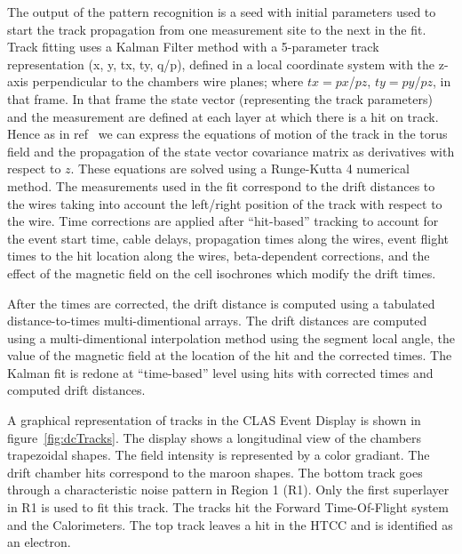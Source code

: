 \documentclass{elsart}
\begin{document}
The output of the pattern recognition
is a seed with initial parameters used to start the track propagation from one measurement site to the next in the fit.
Track fitting uses a Kalman Filter method with a 5-parameter track representation (x, y, tx, ty, q/p), defined
in a local coordinate system with the z-axis perpendicular to the chambers wire planes; where $tx=px$/$pz$,
$ty=py$/$pz$, in that frame.  
In that frame the state vector (representing the track parameters) and the measurement are defined at each layer 
at which there is a hit on track. Hence as in ref~\cite{spiri} we can express the equations of motion of the track in the torus field
and the propagation of the state vector covariance matrix as derivatives with respect to $z$. 
These equations  are solved using a Runge-Kutta 4 numerical method.  
The measurements used in the fit correspond to the drift distances to the wires
taking into account the left/right position of the track with respect to the wire. Time corrections are applied
after ``hit-based'' tracking to account for the event start time, cable delays, propagation times along the
wires, event flight times to the hit location along the wires, beta-dependent corrections, and the effect of
the magnetic field on the cell isochrones which modify the drift times.  

After the times are corrected, the drift distance is computed using a tabulated distance-to-times
multi-dimentional arrays.  The drift distances are computed using a multi-dimentional interpolation method
using the segment local angle, the value of the magnetic field at the location of the hit and the corrected
times.  The Kalman fit is redone at ``time-based'' level using hits with corrected times and computed drift
distances. 

A graphical representation of tracks in the CLAS Event Display is shown in figure~\ref{fig:dcTracks}.  The
display shows a longitudinal view of the chambers trapezoidal shapes. The field intensity is represented by a
color gradiant. The drift chamber hits correspond to the maroon shapes.  The bottom track goes through a
characteristic noise pattern in Region 1 (R1). Only the first superlayer in R1 is used to fit this track.  The
tracks hit the Forward Time-Of-Flight system and the Calorimeters.  The top track leaves a hit in the HTCC
and is identified as an electron. 
\end{document}
